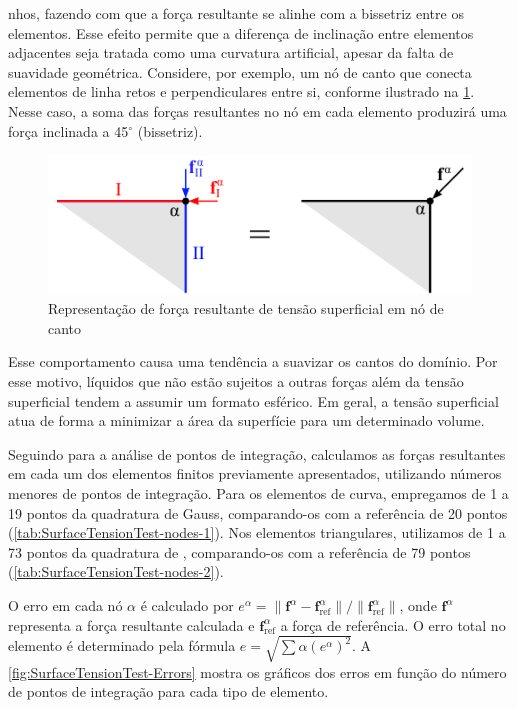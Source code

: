\documentclass[Tese.tex]{subfiles}
\begin{document}
nhos, fazendo com que a força resultante se alinhe com a bissetriz entre os elementos. Esse efeito permite que a diferença de inclinação entre elementos adjacentes seja tratada como uma curvatura artificial, apesar da falta de suavidade geométrica. Considere, por exemplo, um nó de canto que conecta elementos de linha retos e perpendiculares entre si, conforme ilustrado na \cref{fig:SurfaceTension2}. Nesse caso, a soma das forças resultantes no nó em cada elemento produzirá uma força inclinada a 45$^{\circ}$ (bissetriz).

\begin{figure}[!htb]
	\centering
	\caption{Representação de força resultante de tensão superficial em nó de canto}
	\label{fig:SurfaceTension2}
	\includegraphics[scale=1.4]{Figuras/SurfaceTension2.pdf}
\end{figure}

Esse comportamento causa uma tendência a suavizar os cantos do domínio. Por esse motivo, líquidos que não estão sujeitos a outras forças além da tensão superficial tendem a assumir um formato esférico. Em geral, a tensão superficial atua de forma a minimizar a área da superfície para um determinado volume.

Seguindo para a análise de pontos de integração, calculamos as forças resultantes em cada um dos elementos finitos previamente apresentados, utilizando números menores de pontos de integração. Para os elementos de curva, empregamos de 1 a 19 pontos da quadratura de Gauss, comparando-os com a referência de 20 pontos (\cref{tab:SurfaceTensionTest-nodes-1}). Nos elementos triangulares, utilizamos de 1 a 73 pontos da quadratura de , comparando-os com a referência de 79 pontos (\cref{tab:SurfaceTensionTest-nodes-2}). 

O erro em cada nó $\alpha$ é calculado por $e^{\alpha} = \|\mathbf{f}^{\alpha} - \mathbf{f}^{\alpha}_\text{ref}\|/\|\mathbf{f}^{\alpha}_\text{ref}\|$, onde $\mathbf{f}^{\alpha}$ representa a força resultante calculada e $\mathbf{f}^{\alpha}_\text{ref}$ a força de referência. O erro total no elemento é determinado pela fórmula $e = \sqrt{\sum{\alpha} (e^{\alpha})^2}$. A \cref{fig:SurfaceTensionTest-Errors} mostra os gráficos dos erros em função do número de pontos de integração para cada tipo de elemento.
\end{document}
